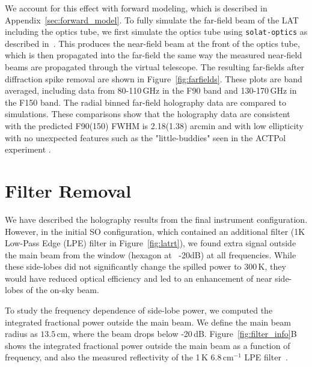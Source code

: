 We account for this effect with forward modeling, which is described in Appendix~\ref{sec:forward_model}.  To fully simulate the far-field beam of the LAT including the optics tube, we first simulate the optics tube using \verb|solat-optics| as described in~\cite{holog_sim_model}.  This produces the near-field beam at the front of the optics tube, which is then propagated into the far-field the same way the measured near-field beams are propagated through the virtual telescope.  The resulting far-fields after diffraction spike removal are shown in Figure~\ref{fig:farfields}.  These plots are band averaged, including data from 80-110\,GHz in the F90 band and 130-170\,GHz in the F150 band.  The radial binned far-field holography data are compared to simulations.  These comparisons show that the holography data are consistent with the predicted F90(150) FWHM is 2.18(1.38) arcmin and with low ellipticity with no unexpected features such as the "little-buddies" seen in the ACTPol experiment \cite{2021arXiv211212226L,Gudmundsson:21}.

\section{Filter Removal}
\label{sec:filter}
We have described the holography results from the final instrument configuration.  However, in the initial SO configuration, which contained an additional filter (1K Low-Pass Edge (LPE) filter in Figure~\ref{fig:latrt}), we found extra signal outside the main beam from the window (hexagon at ~-20dB) at all frequencies.  While these side-lobes did not significantly change the spilled power to 300\,K, they would have reduced optical efficiency and led to an enhancement of near side-lobes of the on-sky beam.

To study the frequency dependence of side-lobe power, we computed the integrated fractional power outside the main beam.  We define the main beam radius as $13.5$\,cm, where the beam drops below -20\,dB.   Figure~\ref{fig:filter_info}B shows the integrated fractional power outside the main beam as a function of frequency, and also the measured reflectivity of the 1\,K 6.8\,cm$^{-1}$ LPE filter~\cite{10.1117/12.673162}.

